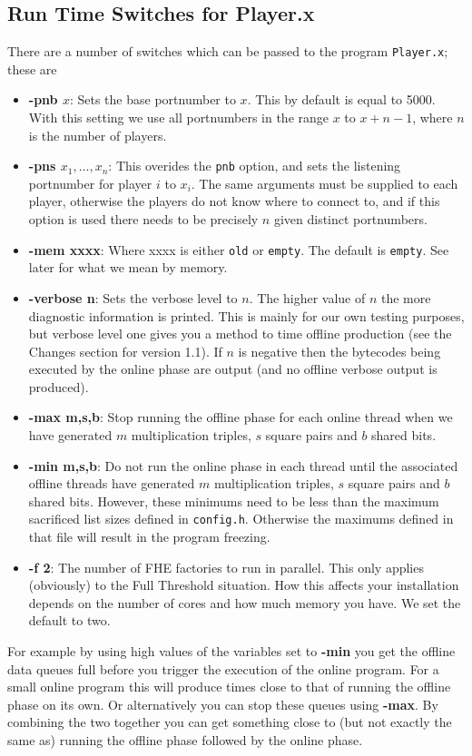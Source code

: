 \subsection{Run Time Switches for Player.x}
There are a number of switches which can be passed to the
program \verb+Player.x+; these are
\begin{itemize}
\item {\bf -pnb $x$}: Sets the base portnumber to $x$. This by
default is equal to 5000. With this setting we use all
portnumbers in the range $x$ to $x+n-1$,
where $n$ is the number of players. 
\item {\bf -pns $x_1,\ldots,x_n$}: This overides the \verb+pnb+
option, and sets the listening portnumber for player
$i$ to $x_i$.
The same arguments must be supplied to each player, otherwise
the players do not know where to connect to, and if this
option is used there needs to be precisely $n$ given
distinct portnumbers.
\item {\bf -mem xxxx}: Where xxxx is either \verb+old+
or \verb+empty+. The default is \verb+empty+.
See later for what we mean by memory.
\item {\bf -verbose n}: Sets the verbose level to $n$. The higher value
of $n$ the more diagnostic information is printed. This is mainly
for our own testing purposes, but verbose level one gives you a method
to time offline production (see the Changes section for version 1.1).
If $n$ is negative then the bytecodes being executed by the online
phase are output (and no offline verbose output is produced).
\item {\bf -max m,s,b}: Stop running the offline phase for each online
thread when we have generated $m$ multiplication triples, $s$ square
pairs and $b$ shared bits.
\item {\bf -min m,s,b}: Do not run the online phase in each thread 
until the associated offline threads have generated $m$ multiplication 
triples, $s$ square pairs and $b$ shared bits.
However, these minimums need to be less than the maximum sacrificed
list sizes defined in \verb+config.h+. Otherwise the maximums
defined in that file will result in the program freezing.
\item {\bf -f 2}: The number of FHE factories to run in parallel.
This only applies (obviously) to the Full Threshold situation.
How this affects your installation depends on the number of cores
and how much memory you have. We set the default to two.
\end{itemize}
For example by using high values of the variables set to {\bf -min} you
get the offline data queues full before you trigger the execution
of the online program. For a small online program this will produce
times close to that of running the offline phase on its own.
Or alternatively you can stop these queues using {\bf -max}. By
combining the two together you can get something close to (but not
exactly the same as) running the offline phase followed by the online
phase.
